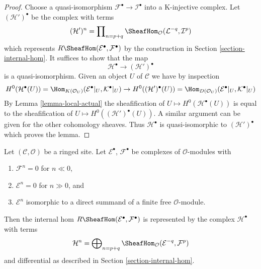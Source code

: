 \begin{proof}
Choose a quasi-isomorphism $\mathcal{F}^\bullet \to \mathcal{I}^\bullet$
into a K-injective complex. Let $(\mathcal{H}')^\bullet$ be the
complex with terms
$$
(\mathcal{H}')^n =
\prod\nolimits_{n = p + q}
\SheafHom_\mathcal{O}(\mathcal{L}^{-q}, \mathcal{I}^p)
$$
which represents $R\SheafHom(\mathcal{E}^\bullet, \mathcal{F}^\bullet)$
by the construction in Section \ref{section-internal-hom}. It suffices
to show that the map
$$
\mathcal{H}^\bullet \longrightarrow (\mathcal{H}')^\bullet
$$
is a quasi-isomorphism. Given an object $U$ of $\mathcal{C}$ we have
by inspection
$$
H^0(\mathcal{H}^\bullet(U)) =
\Hom_{K(\mathcal{O}_U)}(\mathcal{E}^\bullet|_U, \mathcal{K}^\bullet|_U)
\to
H^0((\mathcal{H}')^\bullet(U)) =
\Hom_{D(\mathcal{O}_U)}(\mathcal{E}^\bullet|_U, \mathcal{K}^\bullet|_U)
$$
By Lemma \ref{lemma-local-actual} the sheafification of
$U \mapsto H^0(\mathcal{H}^\bullet(U))$
is equal to the sheafification of
$U \mapsto H^0((\mathcal{H}')^\bullet(U))$. A similar argument can be
given for the other cohomology sheaves. Thus $\mathcal{H}^\bullet$
is quasi-isomorphic to $(\mathcal{H}')^\bullet$ which proves the lemma.
\end{proof}

\begin{lemma}
\label{lemma-Rhom-complex-of-direct-summands-finite-free}
Let $(\mathcal{C}, \mathcal{O})$ be a ringed site.
Let $\mathcal{E}^\bullet$, $\mathcal{F}^\bullet$ be complexes
of $\mathcal{O}$-modules with
\begin{enumerate}
\item $\mathcal{F}^n = 0$ for $n \ll 0$,
\item $\mathcal{E}^n = 0$ for $n \gg 0$, and
\item $\mathcal{E}^n$ isomorphic to a direct summand of a finite
free $\mathcal{O}$-module.
\end{enumerate}
Then the internal hom $R\SheafHom(\mathcal{E}^\bullet, \mathcal{F}^\bullet)$
is represented by the complex $\mathcal{H}^\bullet$ with terms
$$
\mathcal{H}^n =
\bigoplus\nolimits_{n = p + q}
\SheafHom_\mathcal{O}(\mathcal{E}^{-q}, \mathcal{F}^p)
$$
and differential as described in Section \ref{section-internal-hom}.
\end{lemma}

